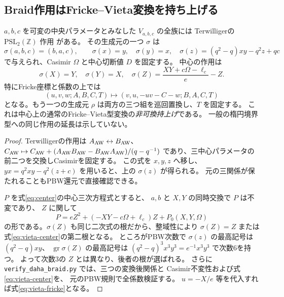 \subsection{Braid作用はFricke--Vieta変換を持ち上げる}
\begin{theorem}[三乗根での量子的Vieta変換]
\label{thm:aw-braid-vieta}
$a,b,c$ を可変の中央パラメータとみなした $V_{a,b,c}$ の全族には
Terwilligerの $\mathrm{PSL}_2(\mathbb Z)$ 作用
\cite[Lemmas 2.3, 2.5, 2.8]{TerwilligerDAHA} がある。
その生成元の一つ $\sigma$ は
\[
 \sigma(a,b,c)=(b,a,c),\qquad
 \sigma(x)=y,\quad\sigma(y)=x,\quad
 \sigma(z)=(q^2-q)xy-q^2z+qc
\]
で与えられ、Casimir $\Omega$ と中心切断値 $D$ を固定する。
中心の作用は
\begin{equation}\label{eq:vieta-center}
 \sigma(X)=Y,\quad \sigma(Y)=X,\quad
 \sigma(Z)=\frac{XY+c\Omega-\ell_c}{e}-Z.
\end{equation}
特にFricke座標と係数の上では
\begin{equation}\label{eq:vieta-fricke}
 (u,v,w;A,B,C,T)\longmapsto
 (v,u,-uv-C-w;B,A,C,T)
\end{equation}
となる。もう一つの生成元 $\rho$ は両方の三つ組を巡回置換し、$T$ を固定する。
これは中心上の通常のFricke--Vieta型変換の\emph{非可換持上げ}である。
一般の楕円境界型への同じ作用の延長は示していない。
\end{theorem}
\begin{proof}
Terwilligerの作用は $A_{\rm AW}\leftrightarrow B_{\rm AW}$、
$C_{\rm AW}\mapsto C_{\rm AW}+(A_{\rm AW}B_{\rm AW}-B_{\rm AW}A_{\rm AW})/(q-q^{-1})$
であり、三中心パラメータの前二つを交換しCasimirを固定する。
この式を $x,y,z$ へ移し、
$yx=q^2xy-q^2(z+c)$ を用いると、上の $\sigma(z)$ が得られる。
元の三関係が保たれることもPBW還元で直接確認できる。

$P$ を式\eqref{eq:center}の中心三次方程式とすると、
$a,b$ と $X,Y$ の同時交換で $P$ は不変であり、
$Z$ に関して
\[
 P=eZ^2+(-XY-c\Omega+\ell_c)Z+P_0(X,Y,\Omega)
\]
の形である。$\sigma(Z)$ も同じ二次式の根だから、整域性により
$\sigma(Z)=Z$ または式\eqref{eq:vieta-center}の第二根となる。
ところがPBW次数で $\sigma(z)$ の最高記号は $(q^2-q)xy$、
$\operatorname{gr}\sigma(Z)$ の最高記号は
$(q^2-q)^3x^3y^3=e^{-1}x^3y^3$ で次数6を持つ。
よって次数3の $Z$ とは異なり、後者の根が選ばれる。
さらに \texttt{verify\_daha\_braid.py} では、三つの変換後関係と
Casimir不変性および式\eqref{eq:vieta-center}を、
元のPBW規則で全係数検証する。
$u=-X/e$ 等を代入すれば式\eqref{eq:vieta-fricke}となる。
\end{proof}

